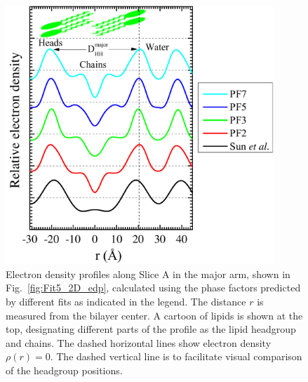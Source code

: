 \begin{figure}[htbp]
  \centering
  \includegraphics[width=0.9\textwidth]{figures/ripple/LAXS/major_diff_models}
  \caption[Electron density profiles along Slice A in the major arm, shown in 
  Fig.~\ref{fig:Fit5_2D_edp}, calculated using the phase factors
  predicted by different fits as indicated in the legend]
  {Electron density profiles along Slice A in the major arm, shown in 
  Fig.~\ref{fig:Fit5_2D_edp}, calculated using the phase factors
  predicted by different fits as indicated in the legend. 
  The distance $r$ is measured from the bilayer center. 
  A cartoon of lipids is shown at the top, designating different parts of the
  profile as the lipid headgroup and chains. 
  The dashed horizontal lines show electron density $\rho(r)=0$. 
  The dashed vertical line is to facilitate visual comparison of the headgroup
  positions.}
  \label{fig:major_diff_models}
\end{figure}

